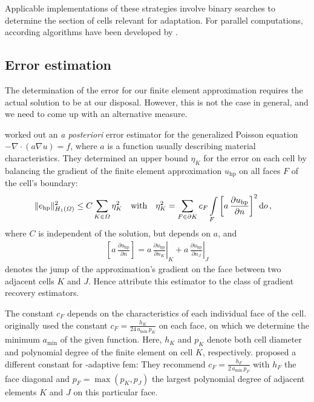 Applicable implementations of these strategies involve binary searches to determine the section of cells relevant for adaptation. For parallel computations, according algorithms have been developed by \textcites[Sec.~3.1]{burstedde2008}[Sec.~5.1]{bangerth2012}.



\subsection{Error estimation}
\label{ssec:estimation}

The determination of the error for our finite element approximation requires the actual solution to be at our disposal. However, this is not the case in general, and we need to come up with an alternative measure.

\textcite{kelly1983} worked out an \textit{a posteriori} error estimator for the generalized Poisson equation $-\nabla \cdot \left( a \nabla u \right) = f$, where $a$ is a function usually describing material characteristics. They determined an upper bound $\eta_K$ for the error on each cell by balancing the gradient of the finite element approximation $u_\text{hp}$ on all faces $F$ of the cell's boundary:
\begin{align}
\label{eq:kelly} \|e_\text{hp}\|_{H_1(\Omega)}^2 &\leq C \sum\limits_{K \in \Omega} \eta_K^2 &&\text{with}&  \eta_K^2 &= \sum\limits_{F \in \partial K} c_F \int\limits_{F} \left[ a \, \frac{\partial u_\text{hp}}{\partial n} \right]^2 \mathop{}\!\mathrm{d}o \,\text{,}
\end{align}
where $C$ is independent of the solution, but depends on $a$, and
\begin{align*}
\left[ a \, \frac{\partial u_\text{hp}}{\partial n} \right] = \left. a \, \frac{\partial u_\text{hp}}{\partial n_K} \right|_K + \left. a \, \frac{\partial u_\text{hp}}{\partial n_J}\right|_J
\end{align*}
denotes the jump of the approximation's gradient on the face between two adjacent cells $K$ and $J$. Hence \textcite{ainsworth1997a} attribute this estimator to the class of gradient recovery estimators.

The constant $c_F$ depends on the characteristics of each individual face of the cell. \textcite{kelly1983} originally used the constant $c_F = \frac{h_K}{24 \, a_\text{min} \, p_K}$ on each face, on which we determine the minimum $a_\text{min}$ of the given function. Here, $h_K$ and $p_K$ denote both cell diameter and polynomial degree of the finite element on cell $K$, respectively. \textcite{davydov2017} proposed a different constant for \hp-adaptive \gls{fem}: They recommend $c_F = \frac{h_F}{2 \, a_\text{min} \, p_F}$ with $h_F$ the face diagonal and $p_F = \max\left(p_K, p_J\right)$ the largest polynomial degree of adjacent elements $K$ and $J$ on this particular face.

